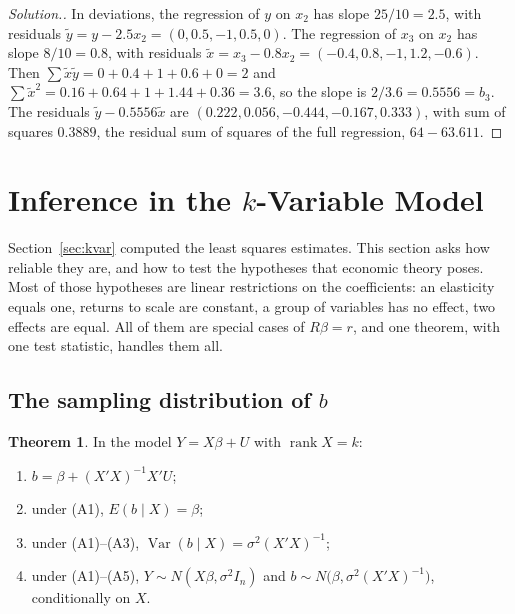 \documentclass[11pt,a4paper]{article}
\numberwithin{equation}{section}
\DeclareMathOperator{\Var}{Var}
\DeclareMathOperator{\rank}{rank}
\theoremstyle{definition}
\newtheorem{thm}{Theorem}[subsection]
\newenvironment{solution}
  {\renewcommand{\qedsymbol}{}\begin{proof}[\textit{Solution}.]}
  {\end{proof}}
\begin{document}
\begin{solution}
In deviations, the regression of $y$ on $x_2$ has slope $25/10 = 2.5$, with residuals $\tilde y = y - 2.5x_2 = (0, 0.5, -1, 0.5, 0)$. The regression of
$x_3$ on $x_2$ has slope $8/10 = 0.8$, with residuals $\tilde x = x_3 - 0.8x_2 = (-0.4, 0.8, -1, 1.2, -0.6)$. Then
$\sum\tilde x\tilde y = 0 + 0.4 + 1 + 0.6 + 0 = 2$ and $\sum\tilde x^2 = 0.16 + 0.64 + 1 + 1.44 + 0.36 = 3.6$, so the slope is $2/3.6 = 0.5556 = b_3$. The residuals
$\tilde y - 0.5556\tilde x$ are $(0.222, 0.056, -0.444, -0.167, 0.333)$, with sum of squares $0.3889$, the residual sum of squares of the full regression,
$64 - 63.611$.
\end{solution}

\section{Inference in the $k$-Variable Model}
\label{sec:infk}

Section~\ref{sec:kvar} computed the least squares estimates. This section asks how reliable they are, and how to test the hypotheses that economic
theory poses. Most of those hypotheses are linear restrictions on the coefficients: an elasticity equals one, returns to scale are constant,
a group of variables has no effect, two effects are equal. All of them are special cases of $R\beta = r$, and one theorem, with one test statistic,
handles them all.

\subsection{The sampling distribution of $b$}
\label{ssec:bdist}

\begin{thm}
\label{thm:bmoments}
In the model $Y = X\beta + U$ with $\rank X = k$:
\begin{enumerate}[label=(\roman*)]
\item $b = \beta + (X'X)^{-1}X'U$;
\item under (A1), $E(b \mid X) = \beta$;
\item under (A1)--(A3), $\Var(b \mid X) = \sigma^2(X'X)^{-1}$;
\item under (A1)--(A5), $Y \sim N(X\beta, \sigma^2I_n)$ and $b \sim N\bigl(\beta, \sigma^2(X'X)^{-1}\bigr)$, conditionally on $X$.
\end{enumerate}
\end{thm}
\end{document}
